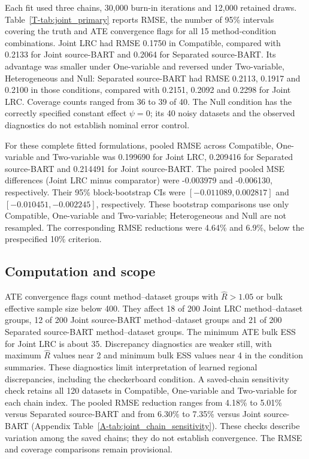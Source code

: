 Each fit used three chains, 30,000 burn-in iterations and 12,000 retained draws. Table~\ref{T-tab:joint_primary} reports RMSE, the number of 95\% intervals covering the truth and ATE convergence flags for all 15 method-condition combinations. Joint LRC had RMSE 0.1750 in Compatible, compared with 0.2133 for Joint source-BART and 0.2064 for Separated source-BART. Its advantage was smaller under One-variable and reversed under Two-variable, Heterogeneous and Null: Separated source-BART had RMSE 0.2113, 0.1917 and 0.2100 in those conditions, compared with 0.2151, 0.2092 and 0.2298 for Joint LRC. Coverage counts ranged from 36 to 39 of 40. The Null condition has the correctly specified constant effect $\psi=0$; its 40 noisy datasets and the observed diagnostics do not establish nominal error control.

For these complete fitted formulations, pooled RMSE across Compatible, One-variable and Two-variable was 0.199690 for Joint LRC, 0.209416 for Separated source-BART and 0.214491 for Joint source-BART. The paired pooled MSE differences (Joint LRC minus comparator) were -0.003979 and -0.006130, respectively. Their 95\% block-bootstrap CIs were $[-0.011089,0.002817]$ and $[-0.010451,-0.002245]$, respectively. These bootstrap comparisons use only Compatible, One-variable and Two-variable; Heterogeneous and Null are not resampled. The corresponding RMSE reductions were 4.64\% and 6.9\%, below the prespecified 10\% criterion.

\subsection{Computation and scope}

ATE convergence flags count method--dataset groups with $\widehat R>1.05$ or bulk effective sample size below 400. They affect 18 of 200 Joint LRC method--dataset groups, 12 of 200 Joint source-BART method--dataset groups and 21 of 200 Separated source-BART method--dataset groups. The minimum ATE bulk ESS for Joint LRC is about 35. Discrepancy diagnostics are weaker still, with maximum $\widehat R$ values near 2 and minimum bulk ESS values near 4 in the condition summaries. These diagnostics limit interpretation of learned regional discrepancies, including the checkerboard condition. A saved-chain sensitivity check retains all 120 datasets in Compatible, One-variable and Two-variable for each chain index. The pooled RMSE reduction ranges from 4.18\% to 5.01\% versus Separated source-BART and from 6.30\% to 7.35\% versus Joint source-BART (Appendix Table~\ref{A-tab:joint_chain_sensitivity}). These checks describe variation among the saved chains; they do not establish convergence. The RMSE and coverage comparisons remain provisional.

